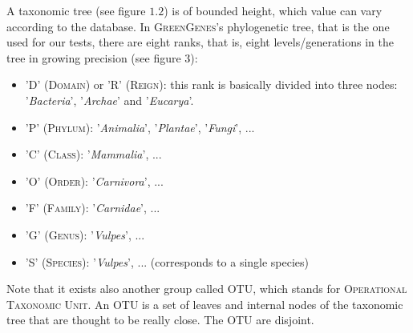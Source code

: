 \documentclass{report}
\begin{document}
A taxonomic tree (see figure $1.2$) is of bounded height, which value can vary according to the database. In \textsc{GreenGenes}'s phylogenetic tree, that is the one used for our tests, there are eight ranks, that is, eight levels/generations in the tree in growing precision (see figure $3$):
\begin{itemize}
\item 'D' (\textsc{Domain}) or 'R' (\textsc{Reign}): this rank is basically divided into three nodes: '\emph{Bacteria}', '\emph{Archae}' and '\emph{Eucarya}'.
\item 'P' (\textsc{Phylum}): '\emph{Animalia}', '\emph{Plantae}', '\emph{Fungi}', ...
\item 'C' (\textsc{Class}): '\emph{Mammalia}', ...
\item 'O' (\textsc{Order}): '\emph{Carnivora}', ...
\item 'F' (\textsc{Family}): '\emph{Carnidae}', ...
\item 'G' (\textsc{Genus}): '\emph{Vulpes}', ...
\item 'S' (\textsc{Species}): '\emph{Vulpes}', ... (corresponds to a single species)
\end{itemize} 

Note that it exists also another group called \textsc{OTU}, which stands for \textsc{Operational Taxonomic Unit}. An \textsc{OTU} is a set of leaves and internal nodes of the taxonomic tree that are thought to be really close. The \textsc{OTU} are disjoint.\\
\end{document}
